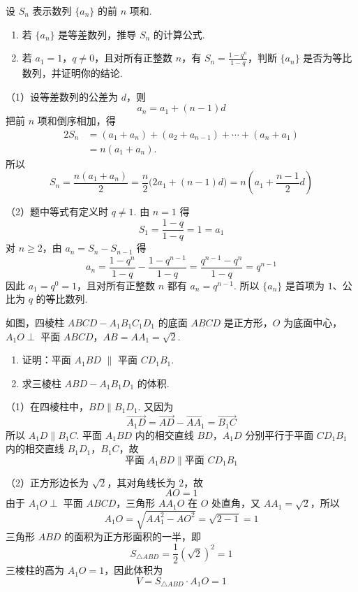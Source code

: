 \begin{problem}
设 \(S_{n}\) 表示数列 \(\{a_{n}\}\) 的前 \(n\) 项和.

\begin{enumerate}
\item 若 \( \{a_{n}\} \) 是等差数列，推导 \( S_{n} \) 的计算公式.
\item 若 \(a_{1} = 1\)，\(q \neq 0\)，且对所有正整数 \(n\)，有 \(S_{n} = \frac{1 - q^{n}}{1 - q}\)，判断 \(\{a_{n}\}\) 是否为等比数列，并证明你的结论.
\end{enumerate}
\end{problem}

\begin{solution}
（1）设等差数列的公差为 \(d\)，则
\[
a_n=a_1+(n-1)d
\]
把前 \(n\) 项和倒序相加，得
\[
\begin{aligned}
2S_n
&=(a_1+a_n)+(a_2+a_{n-1})+\cdots+(a_n+a_1)\\
&=n(a_1+a_n).
\end{aligned}
\]
所以
\[
S_n=\frac{n(a_1+a_n)}2
 =\frac n2\bigl(2a_1+(n-1)d\bigr)
 =n\left(a_1+\frac{n-1}{2}d\right)
\]

（2）题中等式有定义时 \(q\ne1\). 由 \(n=1\) 得
\[
S_1=\frac{1-q}{1-q}=1=a_1
\]
对 \(n\geqslant2\)，由 \(a_n=S_n-S_{n-1}\) 得
\[
a_n=\frac{1-q^n}{1-q}-\frac{1-q^{n-1}}{1-q}
    =\frac{q^{n-1}-q^n}{1-q}
    =q^{n-1}
\]
因此 \(a_1=q^0=1\)，且对所有正整数 \(n\) 都有 \(a_n=q^{n-1}\). 所以 \(\{a_n\}\) 是首项为 \(1\)、公比为 \(q\) 的等比数列.
\end{solution}

\begin{problem}
如图，四棱柱 \(ABCD - A_{1}B_{1}C_{1}D_{1}\) 的底面 \(ABCD\) 是正方形，\(O\) 为底面中心，\(A_{1}O \perp\) 平面 \(ABCD\)，\(AB = AA_{1} = \sqrt{2}\).

\begin{enumerate}
\item 证明：平面 \(A_{1}BD\) \(\parallel\) 平面 \(CD_{1}B_{1}\).
\item 求三棱柱 \( ABD - A_{1}B_{1}D_{1} \) 的体积.
\end{enumerate}

\end{problem}

\begin{solution}
（1）在四棱柱中，\(BD\parallel B_1D_1\). 又因为
\[
\overrightarrow{A_1D}
=\overrightarrow{AD}-\overrightarrow{AA_1}
=\overrightarrow{B_1C}
\]
所以 \(A_1D\parallel B_1C\). 平面 \(A_1BD\) 内的相交直线 \(BD\)，\(A_1D\) 分别平行于平面 \(CD_1B_1\) 内的相交直线 \(B_1D_1\)，\(B_1C\)，故
\[
\text{平面 }A_1BD\parallel\text{平面 }CD_1B_1
\]

（2）正方形边长为 \(\sqrt2\)，其对角线长为 \(2\)，故
\[
AO=1
\]
由于 \(A_1O\perp\) 平面 \(ABCD\)，三角形 \(AA_1O\) 在 \(O\) 处直角，又 \(AA_1=\sqrt2\)，所以
\[
A_1O=\sqrt{AA_1^2-AO^2}
    =\sqrt{2-1}=1
\]
三角形 \(ABD\) 的面积为正方形面积的一半，即
\[
S_{\triangle ABD}=\frac12(\sqrt2)^2=1
\]
三棱柱的高为 \(A_1O=1\)，因此体积为
\[
V=S_{\triangle ABD}\cdot A_1O=1
\]
\end{solution}

